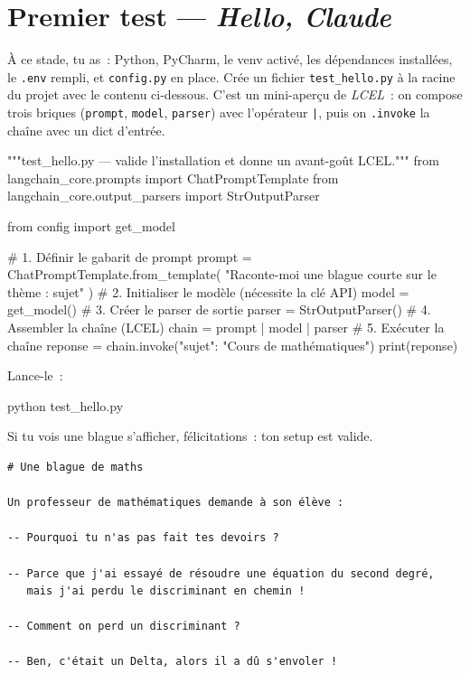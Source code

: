 \documentclass[11pt,a4paper]{article}
\begin{document}
\section{Premier test — \emph{Hello, Claude}}

À ce stade, tu as~: Python, PyCharm, le venv activé, les dépendances
installées, le \texttt{.env} rempli, et \texttt{config.py} en place.
Crée un fichier \texttt{test\_hello.py} à la racine du projet avec
le contenu ci-dessous. C'est un mini-aperçu de \emph{LCEL}~: on
compose trois briques (\texttt{prompt}, \texttt{model},
\texttt{parser}) avec l'opérateur \texttt{|}, puis on
\texttt{.invoke} la chaîne avec un dict d'entrée.

\begin{pythoncode}
"""test_hello.py — valide l'installation et donne un avant-goût LCEL."""
from langchain_core.prompts import ChatPromptTemplate
from langchain_core.output_parsers import StrOutputParser

from config import get_model

# 1. Définir le gabarit de prompt
prompt = ChatPromptTemplate.from_template(
    "Raconte-moi une blague courte sur le thème : {sujet}"
)
# 2. Initialiser le modèle (nécessite la clé API)
model = get_model()
# 3. Créer le parser de sortie
parser = StrOutputParser()
# 4. Assembler la chaîne (LCEL)
chain = prompt | model | parser
# 5. Exécuter la chaîne
reponse = chain.invoke({"sujet": "Cours de mathématiques"})
print(reponse)
\end{pythoncode}

Lance-le~:

\begin{bashcode}
python test_hello.py
\end{bashcode}

Si tu vois une blague s'afficher, félicitations~: ton setup est
valide.

\begin{tcolorbox}[
  colback=white,
  colframe=black!50,
  coltitle=black,
  fonttitle=\footnotesize\bfseries,
  fontupper=\footnotesize,
  title=Sortie de l'exécution,
  breakable,
]
\begin{verbatim}
# Une blague de maths

Un professeur de mathématiques demande à son élève :

-- Pourquoi tu n'as pas fait tes devoirs ?

-- Parce que j'ai essayé de résoudre une équation du second degré,
   mais j'ai perdu le discriminant en chemin !

-- Comment on perd un discriminant ?

-- Ben, c'était un Delta, alors il a dû s'envoler !
\end{verbatim}
\end{tcolorbox}
\end{document}
